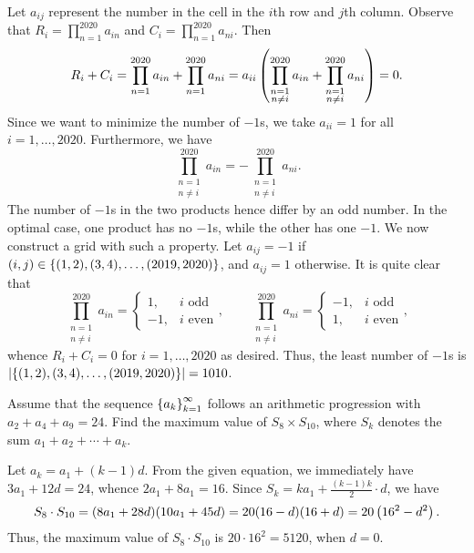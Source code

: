 Let $a_{ij}$ represent the number in the cell in the $i$th row and $j$th column. Observe that $R_i = \prod_{n = 1}^{2020} a_{in}$ and $C_i = \prod_{n=1}^{2020} a_{ni}$. Then \[R_i + C_i = \prod_{n = 1}^{2020} a_{in} + \prod_{n=1}^{2020} a_{ni} = a_{ii} \left( \prod_{\substack{n = 1\\ n \neq i}}^{2020} a_{in} + \prod_{\substack{n = 1\\ n \neq i}}^{2020} a_{ni} \right) = 0.\] Since we want to minimize the number of $-1$s, we take $a_{ii} = 1$ for all $i = 1, \ldots, 2020$. Furthermore, we have \[\prod_{\substack{n = 1\\ n \neq i}}^{2020} a_{in} = -\prod_{\substack{n = 1\\ n \neq i}}^{2020} a_{ni}.\] The number of $-1$s in the two products hence differ by an odd number. In the optimal case, one product has no $-1$s, while the other has one $-1$. We now construct a grid with such a property. Let $a_{ij} = -1$ if $(i, j) \in \left\lbrace (1, 2), (3, 4), \ldots, (2019, 2020) \right\rbrace$, and $a_{ij} = 1$ otherwise. It is quite clear that \[\prod_{\substack{n = 1\\ n \neq i}}^{2020} a_{in} = \begin{cases}
    1, & i \text{ odd}\\
    -1, & i \text{ even}
\end{cases}, \qquad \prod_{\substack{n = 1\\ n \neq i}}^{2020} a_{ni} = \begin{cases}
    -1, & i \text{ odd}\\
    1, & i \text{ even}
\end{cases},\] whence $R_i + C_i = 0$ for $i = 1, \ldots, 2020$ as desired. Thus, the least number of $-1$s is $\left\lvert \left\lbrace (1, 2), (3, 4), \ldots, (2019, 2020) \right\rbrace \right\rvert = 1010$.

\clearpage
\begin{question}[5120]\label{A::2020-O-1-13}
    Assume that the sequence $\left\lbrace a_k \right\rbrace_{k=1}^\infty$ follows an arithmetic progression with $a_2 + a_4 + a_9 = 24$. Find the maximum value of $S_8 \times S_{10}$, where $S_k$ denotes the sum $a_1 + a_2 + \cdots + a_k$.
\end{question}

Let $a_k = a_1 + (k-1)d$. From the given equation, we immediately have $3a_1 + 12d = 24$, whence $2a_1 + 8a_1 = 16$. Since $S_k = ka_1 + \frac{(k-1)k}2 \cdot d$, we have \[S_8 \cdot S_{10} = (8a_1 + 28d)(10a_1 + 45d) = 20(16 - d)(16 + d) = 20\left( 16^2 - d^2 \right).\] Thus, the maximum value of $S_8 \cdot S_{10}$ is $20 \cdot 16^2 = 5120$, when $d = 0$.

